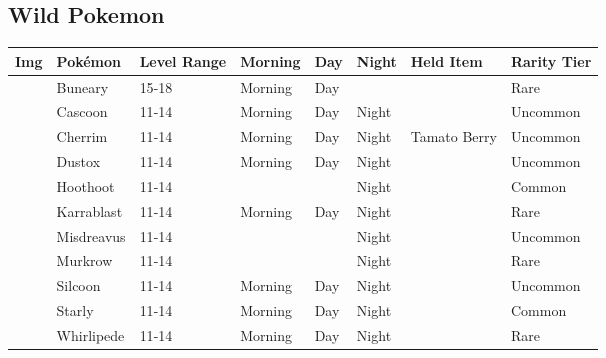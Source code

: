 \subsection{Wild Pokemon}%
\label{subsec:WildPokemon}%
\begin{longtable}{||l l l l l l l l||}%
\hline%
Img&Pokémon&Level Range&Morning&Day&Night&Held Item&Rarity Tier\\%
\hline%
\endhead%
\hline%
&Buneary&15{-}18&Morning&Day&&&Rare\\%
\hline%
&Cascoon&11{-}14&Morning&Day&Night&&Uncommon\\%
\hline%
&Cherrim&11{-}14&Morning&Day&Night&Tamato Berry&Uncommon\\%
\hline%
&Dustox&11{-}14&Morning&Day&Night&&Uncommon\\%
\hline%
&Hoothoot&11{-}14&&&Night&&Common\\%
\hline%
&Karrablast&11{-}14&Morning&Day&Night&&Rare\\%
\hline%
&Misdreavus&11{-}14&&&Night&&Uncommon\\%
\hline%
&Murkrow&11{-}14&&&Night&&Rare\\%
\hline%
&Silcoon&11{-}14&Morning&Day&Night&&Uncommon\\%
\hline%
&Starly&11{-}14&Morning&Day&Night&&Common\\%
\hline%
&Whirlipede&11{-}14&Morning&Day&Night&&Rare\\%
\hline%
\end{longtable}